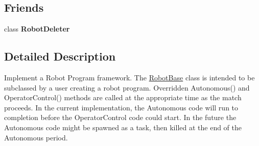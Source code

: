 \subsection*{\-Friends}
\begin{DoxyCompactItemize}
\item 
\hypertarget{classRobotBase_a09a160df094cc13bfc13d732ba175eb3}{class {\bfseries \-Robot\-Deleter}}\label{classRobotBase_a09a160df094cc13bfc13d732ba175eb3}

\end{DoxyCompactItemize}


\subsection{\-Detailed \-Description}
\-Implement a \-Robot \-Program framework. \-The \hyperlink{classRobotBase}{\-Robot\-Base} class is intended to be subclassed by a user creating a robot program. \-Overridden \-Autonomous() and \-Operator\-Control() methods are called at the appropriate time as the match proceeds. \-In the current implementation, the \-Autonomous code will run to completion before the \-Operator\-Control code could start. \-In the future the \-Autonomous code might be spawned as a task, then killed at the end of the \-Autonomous period. 

